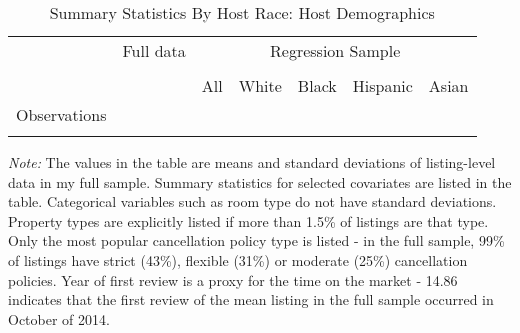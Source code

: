 \begin{table}[htbp]
\hline
\caption{Summary Statistics By Host Race: Host Demographics}
\begin{center}%
\small\begin{tabular}{l c | c | c c c c}
& \multicolumn{1}{c}{Full data} & \multicolumn{5}{c}{Regression Sample}
\\
 \cmidrule(r){3-7}
\\
 & \multicolumn{1}{c}{} & \multicolumn{1}{c}{All} & White & Black & Hispanic & Asian
\\
\hline\hline\noalign{\smallskip} 
\hline
Observations &  &  &  &  &  & \numprint{}
\\
\hline\hline\noalign{\smallskip} \end{tabular} 
\begin{minipage}{6in}
{\it Note:} The values in the table are means and standard deviations of listing-level data in my full sample. Summary statistics for selected covariates are listed in the table. Categorical variables such as room type do not have standard deviations. Property types are explicitly listed if more than 1.5\% of listings are that type. Only the most popular cancellation policy type is listed - in the full sample, 99\% of listings have strict (43\%), flexible (31\%) or moderate (25\%) cancellation policies. Year of first review is a proxy for the time on the market - 14.86 indicates that the first review of the mean listing in the full sample occurred in October of 2014.
\end{minipage}
\end{center}
\end{table}
